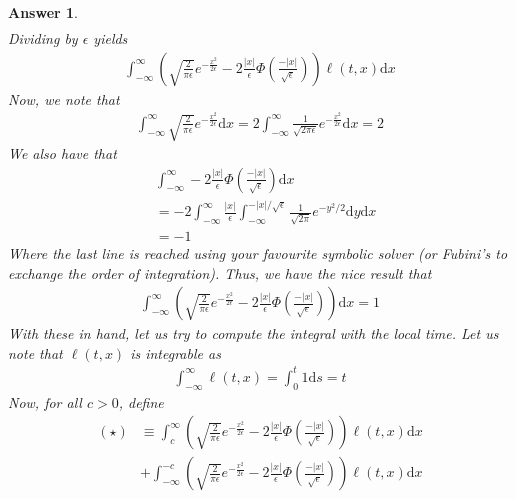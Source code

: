 \documentclass[12pt]{article}
\theoremstyle{colon}
\newtheorem*{answer}{Answer}
\begin{document}
\begin{answer}
\begin{align*}
  \end{align*}
  Dividing by $\epsilon$ yields
  \begin{gather*}
    \int_{-\infty}^\infty \left(\sqrt{\frac{2}{\pi \epsilon}} e^{-\frac{x^2}{2 \epsilon}}  - 2 \frac{\lvert x \rvert}{\epsilon} \Phi\left(\frac{-\lvert x \rvert }{\sqrt{\epsilon}}\right) \right) \ell(t,x) \text{d}x
  \end{gather*}
  Now, we note that
  \begin{gather*}
    \int_{-\infty}^\infty \sqrt{\frac{2}{\pi \epsilon}} e^{-\frac{x^2}{2 \epsilon}} \text{d}x = 2 \int_{-\infty}^\infty \frac{1}{\sqrt{2 \pi \epsilon}} e^{-\frac{x^2}{2 \epsilon}} \text{d}x = 2
  \end{gather*}
  We also have that
  \begin{align*}
    &\int_{-\infty}^\infty -2 \frac{\lvert x \rvert}{\epsilon} \Phi\left(\frac{-\lvert x \rvert }{\sqrt{\epsilon}}\right) \text{d}x \\
    &= -2 \int_{-\infty}^\infty \frac{\lvert x \rvert}{\epsilon} \int_{-\infty}^{-\lvert x \rvert/\sqrt{\epsilon}} \frac{1}{\sqrt{2 \pi}} e^{-y^2/2} \text{d}y \text{d}x \\
    &= -1
  \end{align*}
  Where the last line is reached using your favourite symbolic solver (or Fubini's to exchange the order of integration). Thus, we have the nice result that
  \begin{gather*}
    \int_{-\infty}^\infty \left(\sqrt{\frac{2}{\pi \epsilon}} e^{-\frac{x^2}{2 \epsilon}}  - 2 \frac{\lvert x \rvert}{\epsilon} \Phi\left(\frac{-\lvert x \rvert }{\sqrt{\epsilon}}\right) \right) \text{d}x = 1
  \end{gather*}
  With these in hand, let us try to compute the integral with the local time. Let us note that $\ell(t,x)$ is integrable as
  \begin{gather*}
    \int_{-\infty}^\infty \ell(t,x) = \int_0^t 1 \text{d}s = t
  \end{gather*}
  Now, for all $c > 0$, define
  \begin{align*}
    (\star) &\equiv \int_{c}^\infty \left(\sqrt{\frac{2}{\pi \epsilon}} e^{-\frac{x^2}{2 \epsilon}}  - 2 \frac{\lvert x \rvert}{\epsilon} \Phi\left(\frac{-\lvert x \rvert }{\sqrt{\epsilon}}\right) \right) \ell(t,x) \text{d}x \\
    &+ \int_{-\infty}^{-c} \left(\sqrt{\frac{2}{\pi \epsilon}} e^{-\frac{x^2}{2 \epsilon}}  - 2 \frac{\lvert x \rvert}{\epsilon} \Phi\left(\frac{-\lvert x \rvert }{\sqrt{\epsilon}}\right) \right) \ell(t,x) \text{d}x

\end{align*}
\end{answer}
\end{document}
